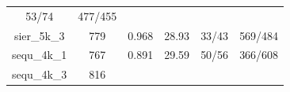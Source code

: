 \documentclass[]{article}
\begin{document}
\begin{longtable}[]{@{}cccccc@{}}
\begin{minipage}[t]{0.18\columnwidth}
53/74\strut
\end{minipage} & \begin{minipage}[t]{0.22\columnwidth}\centering\strut
477/455\strut
\end{minipage}\tabularnewline
\begin{minipage}[t]{0.11\columnwidth}\centering\strut
sier\_5k\_3\strut
\end{minipage} & \begin{minipage}[t]{0.07\columnwidth}\centering\strut
779\strut
\end{minipage} & \begin{minipage}[t]{0.11\columnwidth}\centering\strut
0.968\strut
\end{minipage} & \begin{minipage}[t]{0.13\columnwidth}\centering\strut
28.93\strut
\end{minipage} & \begin{minipage}[t]{0.18\columnwidth}\centering\strut
33/43\strut
\end{minipage} & \begin{minipage}[t]{0.22\columnwidth}\centering\strut
569/484\strut
\end{minipage}\tabularnewline
\begin{minipage}[t]{0.11\columnwidth}\centering\strut
sequ\_4k\_1\strut
\end{minipage} & \begin{minipage}[t]{0.07\columnwidth}\centering\strut
767\strut
\end{minipage} & \begin{minipage}[t]{0.11\columnwidth}\centering\strut
0.891\strut
\end{minipage} & \begin{minipage}[t]{0.13\columnwidth}\centering\strut
29.59\strut
\end{minipage} & \begin{minipage}[t]{0.18\columnwidth}\centering\strut
50/56\strut
\end{minipage} & \begin{minipage}[t]{0.22\columnwidth}\centering\strut
366/608\strut
\end{minipage}\tabularnewline
\begin{minipage}[t]{0.11\columnwidth}\centering\strut
sequ\_4k\_3\strut
\end{minipage} & \begin{minipage}[t]{0.07\columnwidth}\centering\strut
816\strut
\end{minipage} & \begin{minipage}[t]{0.11\columnwidth}\centering\strut

\end{minipage}
\end{longtable}
\end{document}
